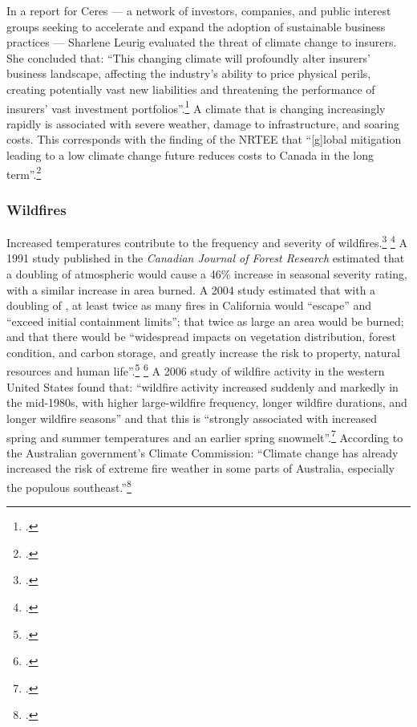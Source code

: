 In a report for Ceres --- a  network of investors, companies, and public interest groups seeking to accelerate and expand the adoption of sustainable business practices --- Sharlene Leurig evaluated the threat of climate change to insurers.
She concluded that: ``This changing climate will profoundly alter insurers' business landscape, affecting the industry's ability to price physical perils, creating potentially vast new liabilities and threatening the performance of insurers' vast investment portfolios''.\footcite[][p. 9]{ClimateRiskInsurers}
A climate that is changing increasingly rapidly is associated with severe weather, damage to infrastructure, and soaring costs.
This corresponds with the finding of the NRTEE that ``[g]lobal mitigation leading to a low climate change future reduces costs to Canada in the long term''.\footcite[][p. 16]{NRTEEPrice}



	\subsubsection{Wildfires}
	


Increased temperatures contribute to the frequency and severity of wildfires.\footcite[][p. 33, 48, 50, 51, 53, 65 ]{IPCCar4_syr} \footcite[See also: ][]{UCSWildfire}
A 1991 study published in the \emph{Canadian Journal of Forest Research} estimated that a doubling of atmospheric  would cause a 46\% increase in seasonal severity rating, with a similar increase in area burned.
A 2004 study estimated that with a doubling of , at least twice as many fires in California would ``escape'' and ``exceed initial containment limits''; that twice as large an area would be burned; and that there would be ``widespread impacts on vegetation distribution, forest condition, and carbon storage, and greatly increase the risk to property, natural resources and human life''.\footcite[][p. 169]{FriedWildfire} \footcite[See also: ][]{WesterlingWildfire}
A 2006 study of wildfire activity in the western United States found that: ``wildfire activity increased suddenly and markedly in the mid-1980s, with higher large-wildfire frequency, longer wildfire durations, and longer wildfire seasons'' and that this is ``strongly associated with increased spring and summer temperatures and an earlier spring snowmelt''.\footcite[][p. 940--943]{Westerling2006}
According to the Australian government's Climate Commission: ``Climate change has already increased the risk of extreme fire weather in some parts of Australia, especially the populous southeast.''\footcite[][p. 4]{CriticalDecade2013}



